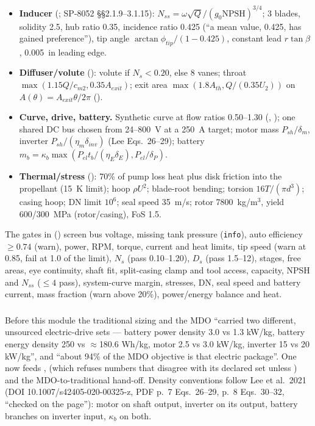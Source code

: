\begin{itemize}
``should come from a real pump curve''.
\item \textbf{Inducer} (; SP-8052 \S\S2.1.9--3.1.15):
$N_{ss}=\omega\sqrt Q/(g_0\mathrm{NPSH})^{3/4}$; 3 blades, solidity 2.5, hub ratio
0.35, incidence ratio 0.425 (``a mean value, 0.425, has gained preference''), tip
angle $\arctan\phi_{tip}/(1-0.425)$, constant lead $r\tan\beta$, 0.005~in leading edge.
\item \textbf{Diffuser/volute} (): volute if $N_s<0.20$, else 8 vanes;
throat $\max(1.15Q/c_{m2},0.35A_{exit})$; exit area $\max(1.8A_{th},Q/(0.35U_2))$
on $A(\theta)=A_{exit}\theta/2\pi$ ().
\item \textbf{Curve, drive, battery.} Synthetic curve at flow ratios 0.50--1.30
(, ); one shared DC bus chosen from
24--800~V at a 250~A target; motor mass $P_{sh}/\delta_m$, inverter
$P_{sh}/(\eta_m\delta_{inv})$ (Lee Eqs.~26--29); battery
$m_b=\kappa_b\max(P_{el}t_b/(\eta_E\delta_E),P_{el}/\delta_P)$.
\item \textbf{Thermal/stress} (): 70\% of pump loss heat plus disk
friction into the propellant (15~K limit); hoop $\rho U^2$; blade-root bending;
torsion $16T/(\pi d^3)$; casing hoop; DN limit $10^6$; seal speed 35~m/s; rotor
7800~kg/m$^3$, yield 600/300~MPa (rotor/casing), FoS 1.5.
\end{itemize}
The gates in  () screen bus voltage, missing tank
pressure (\texttt{info}), auto efficiency $\ge0.74$ (warn), power, RPM, torque,
current and heat limits, tip speed (warn at 0.85, fail at 1.0 of the limit), $N_s$
(pass 0.10--1.20), $D_s$ (pass 1.5--12), stages, free areas, eye continuity, shaft
fit, split-casing clamp and tool access, capacity, NPSH and $N_{ss}$ ($\le4$ pass),
system-curve margin, stresses, DN, seal speed and battery current, mass fraction
(warn above 20\%), power/energy balance and heat.

\subsubsection*{}

Before this module the traditional sizing and the MDO ``carried two different,
unsourced electric-drive sets — battery power density 3.0 vs 1.3 kW/kg, battery
energy density 250 vs $\approx$180.6 Wh/kg, motor 2.5 vs 3.0 kW/kg, inverter 15 vs
20 kW/kg'', and ``about 94\% of the MDO objective is that electric package''. One
 now feeds ,
 (which refuses numbers that disagree with its declared set
unless ) and the MDO-to-traditional hand-off. Density conventions
follow Lee et al.\ 2021 (DOI 10.1007/s42405-020-00325-z, PDF p.~7 Eqs.~26--29,
p.~8 Eqs.~30--32, ``checked on the page''): motor on shaft output, inverter on its
output, battery branches on inverter input, $\kappa_b$ on both.

